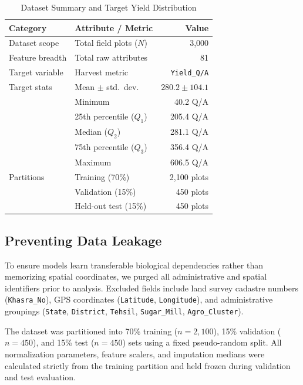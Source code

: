\documentclass[conference,10pt,letterpaper]{IEEEtran}
\begin{document}
\begin{table}[htbp]
\caption{Dataset Summary and Target Yield Distribution}
\label{tab:dataset_summary}
\centering
\footnotesize
\setlength{\tabcolsep}{4pt}
\begin{tabular*}{\columnwidth}{@{\extracolsep{\fill}}llr@{}}
\toprule
\textbf{Category} & \textbf{Attribute / Metric} & \textbf{Value} \\
\midrule
Dataset scope   & Total field plots ($N$)       & 3,000 \\
Feature breadth & Total raw attributes          & 81 \\
Target variable & Harvest metric                & \texttt{Yield\_Q/A} \\
\midrule
Target stats    & Mean $\pm$ std.\ dev.         & $280.2 \pm 104.1$ \\
                & Minimum                       & 40.2 Q/A \\
                & 25th percentile ($Q_1$)       & 205.4 Q/A \\
                & Median ($Q_2$)                & 281.1 Q/A \\
                & 75th percentile ($Q_3$)       & 356.4 Q/A \\
                & Maximum                       & 606.5 Q/A \\
\midrule
Partitions      & Training (70\%)               & 2,100 plots \\
                & Validation (15\%)             & 450 plots \\
                & Held-out test (15\%)          & 450 plots \\
\bottomrule
\end{tabular*}
\end{table}

\subsection{Preventing Data Leakage}
To ensure models learn transferable biological dependencies rather than memorizing spatial coordinates, we purged all administrative and spatial identifiers prior to analysis. Excluded fields include land survey cadastre numbers (\texttt{Khasra\_No}), GPS coordinates (\texttt{Latitude}, \texttt{Longitude}), and administrative groupings (\texttt{State}, \texttt{District}, \texttt{Tehsil}, \texttt{Sugar\_Mill}, \texttt{Agro\_Cluster}). 

The dataset was partitioned into 70\% training ($n = 2{,}100$), 15\% validation ($n = 450$), and 15\% test ($n = 450$) sets using a fixed pseudo-random split. All normalization parameters, feature scalers, and imputation medians were calculated strictly from the training partition and held frozen during validation and test evaluation.
\end{document}
